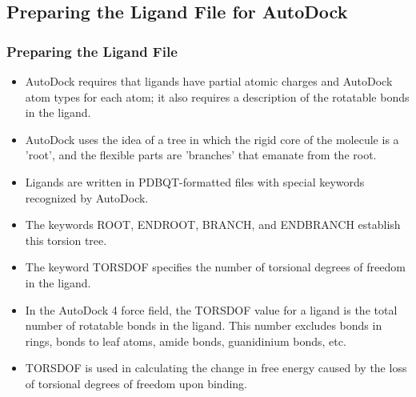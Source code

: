 \documentclass[slidestop,mathserif,compress,xcolor=svgnames]{beamer}
\begin{document}
\subsection{Preparing the Ligand File for AutoDock}
\begin{frame}[allowframebreaks]
  \frametitle{\small Preparing the Ligand File}
  \begin{block}{}
    \begin{itemize}
      \item AutoDock requires that ligands have partial atomic charges and 
AutoDock atom types for each atom; it also requires a description of the rotatable bonds in the ligand.
      \item AutoDock uses the idea of a tree in which the rigid core of the molecule is a 'root', and the flexible parts are 'branches' that emanate from the root.  
      \item Ligands are written in PDBQT-formatted files with special keywords recognized by AutoDock.  
      \item The keywords ROOT, ENDROOT, BRANCH, and ENDBRANCH establish this torsion tree. 
      \item The keyword TORSDOF specifies the number of torsional degrees of freedom in the ligand. 
      \item In the AutoDock 4 force field, the TORSDOF value for a ligand is the total number of rotatable bonds in the ligand. This number excludes 
bonds in rings, bonds to leaf atoms, amide bonds, guanidinium bonds, 
etc. 
      \item TORSDOF is used in calculating the change in free energy caused 
by the loss of torsional degrees of freedom upon binding.
    \end{itemize}
  \end{block}


\end{frame}
\end{document}
